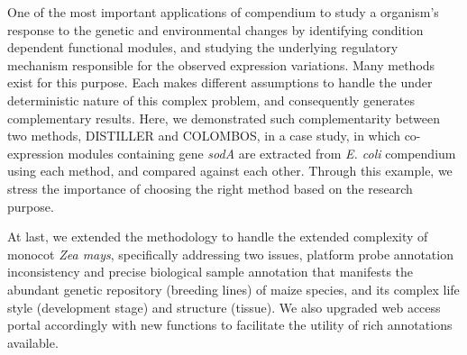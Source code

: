 %
%
One of the most important applications of compendium to study a
organism's response to the genetic and environmental changes by
identifying condition dependent functional modules, and studying the
underlying regulatory mechanism responsible for the observed expression
variations.
%
Many methods exist for this purpose. Each makes different assumptions to
handle the under deterministic nature of this complex problem, and
consequently generates complementary results.
%
Here, we demonstrated such complementarity between two methods,
DISTILLER and COLOMBOS, in a case study, in which co-expression modules
containing gene \textit{sodA} are extracted from \textit{E. coli}
compendium using each method, and compared against each other.
%
Through this example, we stress the importance of choosing the right
method based on the research purpose.


%
At last, we extended the methodology to handle the extended complexity
of monocot \textit{Zea mays}, specifically addressing two issues,
platform probe annotation inconsistency and precise biological sample
annotation that manifests the abundant genetic repository (breeding
lines) of maize species, and its complex life style (development stage)
and structure (tissue).
%
We also upgraded web access portal accordingly with new functions to
facilitate the utility of rich annotations available.




\cleardoublepage


